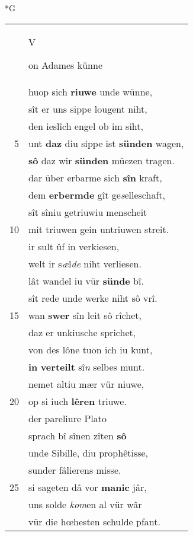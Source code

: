 \documentclass[8pt,a4paper,notitlepage]{article}
\begin{document}
\begin{table}[ht]
\begin{minipage}[t]{0.5\linewidth}
\small
\begin{center}*G
\end{center}
\begin{tabular}{rl}
 & \begin{large}V\end{large}on Adames künne\\ 
 & huop sich \textbf{riuwe} unde wünne,\\ 
 & sît er uns sippe lougent niht,\\ 
 & den ieslîch engel ob im siht,\\ 
5 & unt \textbf{daz} diu sippe ist \textbf{sünden} wagen,\\ 
 & \textbf{sô} daz wir \textbf{sünden} müezen tragen.\\ 
 & dar über erbarme sich \textbf{sîn} kraft,\\ 
 & dem \textbf{erbermde} gît ge\textit{s}elleschaft,\\ 
 & sît sîniu getriuwiu menscheit\\ 
10 & mit triuwen gein untriuwen streit.\\ 
 & ir sult ûf in verkiesen,\\ 
 & welt ir s\textit{æ}l\textit{de} niht verliesen.\\ 
 & lât wandel iu vür \textbf{sünde} bî.\\ 
 & sît rede unde werke niht sô vrî.\\ 
15 & wan \textbf{swer} sîn leit sô rîchet,\\ 
 & daz er unkiusche sprichet,\\ 
 & von des lône tuon ich iu kunt,\\ 
 & \textbf{in} \textbf{verteilt} sî\textit{n} selbes munt.\\ 
 & nemet altiu mær vür niuwe,\\ 
20 & op si iuch \textbf{lêren} triuwe.\\ 
 & der pareliure Plato\\ 
 & sprach bî sînen zîten \textbf{sô}\\ 
 & unde Sibille, diu prophêtisse,\\ 
 & sunder fâlierens misse.\\ 
25 & si sageten dâ vor \textbf{manic} jâr,\\ 
 & uns solde \textit{kom}en al vür wâr\\ 
 & vür die hœhesten schulde pfant.\\ 

\end{tabular}
\end{minipage}
\end{table}
\end{document}
